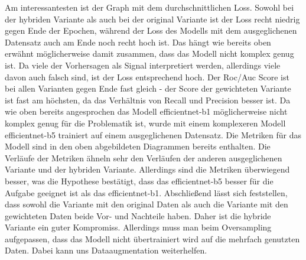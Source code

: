 \documentclass[12pt, a4paper]{article}
\begin{document}
Am interessantesten ist der Graph mit dem durchschnittlichen Loss. Sowohl bei der hybriden Variante als auch bei der original Variante ist der Loss recht niedrig gegen Ende der Epochen, während der Loss des Modells mit dem ausgeglichenen Datensatz auch am Ende noch recht hoch ist. Das hängt wie bereits oben erwähnt möglicherweise damit zusammen, dass das Modell nicht komplex genug ist. Da viele der Vorhersagen als Signal interpretiert werden, allerdings viele davon auch falsch sind, ist der Loss entsprechend hoch. Der Roc/Auc Score ist bei allen Varianten gegen Ende fast gleich - der Score der gewichteten Variante ist fast am höchsten, da das Verhältnis von Recall und Precision besser ist. Da wie oben bereits angesprochen das Modell efficientnet-b1 möglicherweise nicht komplex genug für die Problematik ist, wurde mit einem komplexeren Modell efficientnet-b5 trainiert auf einem ausgeglichenen Datensatz. Die Metriken für das Modell sind in den oben abgebildeten Diagrammen bereits enthalten. Die Verläufe der Metriken ähneln sehr den Verläufen der anderen ausgeglichenen Variante und der hybriden Variante. Allerdings sind die Metriken überwiegend besser, was die Hypothese bestätigt, dass das efficientnet-b5 besser für die Aufgabe geeignet ist als das efficientnet-b1.
\newline
Abschließend lässt sich feststellen, dass sowohl die Variante mit den original Daten als auch die Variante mit den gewichteten Daten beide Vor- und Nachteile haben. Daher ist die hybride Variante ein guter Kompromiss. Allerdings muss man beim Oversampling aufgepassen, dass das Modell nicht übertrainiert wird auf die mehrfach genutzten Daten. Dabei kann uns Dataaugmentation weiterhelfen.
\end{document}
